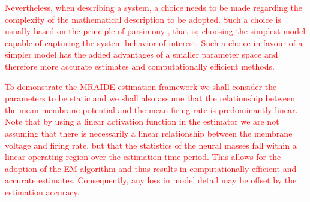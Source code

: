 \documentclass[review,authoryear,3p]{elsarticle}
\newcommand{\ken}[1]{\textcolor{red}{#1}}
\begin{document}


\ken{Nevertheless, when describing a system, a choice needs to be made regarding the complexity of the mathematical description to be adopted. Such a choice is usually based on the principle of parsimony \cite{burnham2002}, that is; choosing the simplest model capable of capturing the system behavior of interest. Such a choice in favour of a simpler model has the added advantages of a smaller parameter space and therefore more accurate estimates and computationally efficient methods.}

\ken{To demonstrate the MRAIDE estimation framework we shall consider the parameters to be static and we shall also assume that the relationship between the mean membrane potential and the mean firing rate is predominantly linear. Note that by using a linear activation function in the estimator we are not assuming that there is necessarily a linear relationship between the membrane voltage and firing rate, but that the statistics of the neural masses fall within a linear operating region over the estimation time period. This allows for the adoption of the EM algorithm and thus results in computationally efficient and accurate estimates. Consequently, any loss in model detail may be offset by the estimation accuracy.}
\end{document}
